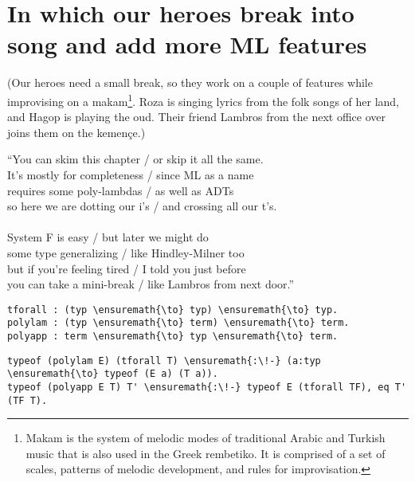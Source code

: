 \section{In which our heroes break into song and add more ML
features}\label{in-which-our-heroes-break-into-song-and-add-more-ml-features}

\begin{scenecomment}
(Our heroes need a small break, so they work on a couple of features while improvising on a makam\footnote{Makam is the system of melodic modes of traditional Arabic and Turkish music that is also used in the Greek rembetiko. It is comprised of a set of scales, patterns of melodic development, and rules for improvisation.}. Roza is singing lyrics from the folk songs of her land, and Hagop is playing the oud. Their friend Lambros from the next office over joins them on the kemen\c{c}e.)
\end{scenecomment}

\begin{versy}
``You can skim this chapter / or skip it all the same. \\
It's mostly for completeness / since ML as a name \\
requires some poly-lambdas / as well as ADTs \\
so here we are dotting our i's / and crossing all our t's. \\
\hspace{1em} \vspace{-0.5em} \\
System F is easy / but later we might do \\
some type generalizing / like Hindley-Milner too \\
but if you're feeling tired / I told you just before \\
you can take a mini-break / like Lambros from next door.''
\end{versy}

\begin{verbatim}
tforall : (typ \ensuremath{\to} typ) \ensuremath{\to} typ.
polylam : (typ \ensuremath{\to} term) \ensuremath{\to} term.
polyapp : term \ensuremath{\to} typ \ensuremath{\to} term.
\end{verbatim}

\importantCodeblock{}

\begin{verbatim}
typeof (polylam E) (tforall T) \ensuremath{:\!-} (a:typ \ensuremath{\to} typeof (E a) (T a)).
typeof (polyapp E T) T' \ensuremath{:\!-} typeof E (tforall TF), eq T' (TF T).
\end{verbatim}

